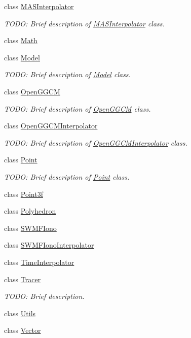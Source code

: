\begin{DoxyCompactItemize}
class \hyperlink{classccmc_1_1_m_a_s_interpolator}{M\-A\-S\-Interpolator}
\begin{DoxyCompactList}\small\item\em T\-O\-D\-O\-: Brief description of \hyperlink{classccmc_1_1_m_a_s_interpolator}{M\-A\-S\-Interpolator} class. \end{DoxyCompactList}\item 
class \hyperlink{classccmc_1_1_math}{Math}
\item 
class \hyperlink{classccmc_1_1_model}{Model}
\begin{DoxyCompactList}\small\item\em T\-O\-D\-O\-: Brief description of \hyperlink{classccmc_1_1_model}{Model} class. \end{DoxyCompactList}\item 
class \hyperlink{classccmc_1_1_open_g_g_c_m}{Open\-G\-G\-C\-M}
\begin{DoxyCompactList}\small\item\em T\-O\-D\-O\-: Brief description of \hyperlink{classccmc_1_1_open_g_g_c_m}{Open\-G\-G\-C\-M} class. \end{DoxyCompactList}\item 
class \hyperlink{classccmc_1_1_open_g_g_c_m_interpolator}{Open\-G\-G\-C\-M\-Interpolator}
\begin{DoxyCompactList}\small\item\em T\-O\-D\-O\-: Brief description of \hyperlink{classccmc_1_1_open_g_g_c_m_interpolator}{Open\-G\-G\-C\-M\-Interpolator} class. \end{DoxyCompactList}\item 
class \hyperlink{classccmc_1_1_point}{Point}
\begin{DoxyCompactList}\small\item\em T\-O\-D\-O\-: Brief description of \hyperlink{classccmc_1_1_point}{Point} class. \end{DoxyCompactList}\item 
class \hyperlink{classccmc_1_1_point3f}{Point3f}
\item 
class \hyperlink{classccmc_1_1_polyhedron}{Polyhedron}
\item 
class \hyperlink{classccmc_1_1_s_w_m_f_iono}{S\-W\-M\-F\-Iono}
\item 
class \hyperlink{classccmc_1_1_s_w_m_f_iono_interpolator}{S\-W\-M\-F\-Iono\-Interpolator}
\item 
class \hyperlink{classccmc_1_1_time_interpolator}{Time\-Interpolator}
\item 
class \hyperlink{classccmc_1_1_tracer}{Tracer}
\begin{DoxyCompactList}\small\item\em T\-O\-D\-O\-: Brief description. \end{DoxyCompactList}\item 
class \hyperlink{classccmc_1_1_utils}{Utils}
\item 
class \hyperlink{classccmc_1_1_vector}{Vector}
\end{DoxyCompactItemize}
